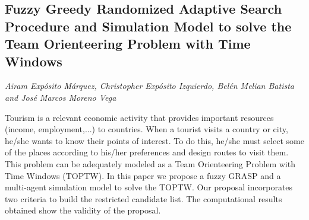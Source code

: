 \documentclass[../booklet.tex]{subfiles}
\begin{document}
\subsection[Fuzzy Greedy Randomized Adaptive Search Procedure and Simulation Model to solve the Team Orienteering Problem with Time Windows. {\it Airam Expósito Márquez, Christopher Expósito Izquierdo, Belén Melian Batista and José Marcos Moreno Vega}]{Fuzzy Greedy Randomized Adaptive Search Procedure and Simulation Model to solve the Team Orienteering Problem with Time Windows}
   

\begin{center}
  {\it Airam Expósito Márquez, Christopher Expósito Izquierdo, Belén Melian Batista and José Marcos Moreno Vega}
\end{center}



Tourism is a relevant economic activity that provides important resources (income, employment,...) to countries. When a tourist visits a country or city, he/she wants to know their points of interest. To do this, he/she must select some of the places according to his/her preferences and design routes to visit them. This problem can be adequately modeled as a Team Orienteering Problem with Time Windows (TOPTW). In this paper we propose a fuzzy GRASP and a multi-agent simulation model to solve the TOPTW. Our proposal incorporates two criteria to build the restricted candidate list. The computational results obtained show the validity of the proposal.
\end{document}
